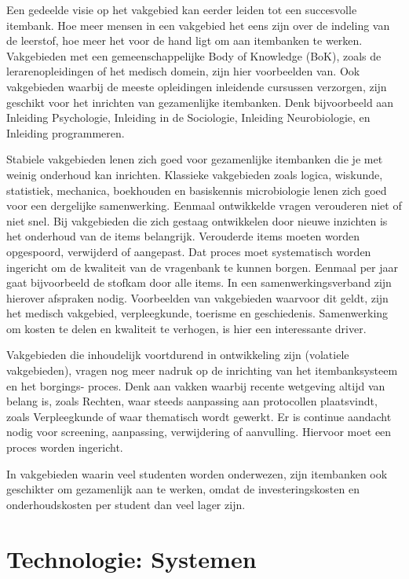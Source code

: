 \documentclass[
]{book}
\begin{document}
Een gedeelde visie op het vakgebied kan eerder leiden tot een succesvolle itembank. Hoe meer mensen in een vakgebied het eens zijn over de indeling van de leerstof, hoe meer het voor de hand ligt om aan itembanken te werken. Vakgebieden met een gemeenschappelijke Body of Knowledge (BoK), zoals de lerarenopleidingen of het medisch domein, zijn hier voorbeelden van. Ook vakgebieden waarbij de meeste opleidingen inleidende cursussen verzorgen, zijn geschikt voor het inrichten van gezamenlijke itembanken. Denk bijvoorbeeld aan Inleiding Psychologie, Inleiding in de Sociologie, Inleiding Neurobiologie, en Inleiding programmeren.

Stabiele vakgebieden lenen zich goed voor gezamenlijke itembanken die je met weinig onderhoud kan inrichten. Klassieke vakgebieden zoals logica, wiskunde, statistiek, mechanica, boekhouden en basiskennis microbiologie lenen zich goed voor een dergelijke samenwerking. Eenmaal ontwikkelde vragen verouderen niet of niet snel. Bij vakgebieden die zich gestaag ontwikkelen door nieuwe inzichten is het onderhoud van de items belangrijk. Verouderde items moeten worden opgespoord, verwijderd of aangepast. Dat proces moet systematisch worden ingericht om de kwaliteit van de vragenbank te kunnen borgen. Eenmaal per jaar gaat bijvoorbeeld de stofkam door alle items. In een samenwerkingsverband zijn hierover afspraken nodig. Voorbeelden van vakgebieden waarvoor dit geldt, zijn het medisch vakgebied, verpleegkunde, toerisme en geschiedenis. Samenwerking om kosten te delen en kwaliteit te verhogen, is hier een interessante driver.

Vakgebieden die inhoudelijk voortdurend in ontwikkeling zijn (volatiele vakgebieden), vragen nog meer nadruk op de inrichting van het itembanksysteem en het borgings- proces. Denk aan vakken waarbij recente wetgeving altijd van belang is, zoals Rechten, waar steeds aanpassing aan protocollen plaatsvindt, zoals Verpleegkunde of waar thematisch wordt gewerkt. Er is continue aandacht nodig voor screening, aanpassing, verwijdering of aanvulling. Hiervoor moet een proces worden ingericht.

In vakgebieden waarin veel studenten worden onderwezen, zijn itembanken ook geschikter om gezamenlijk aan te werken, omdat de investeringskosten en onderhoudskosten per student dan veel lager zijn.

\hypertarget{technologie-systemen}{%
\section{Technologie: Systemen}\label{technologie-systemen}}
\end{document}
